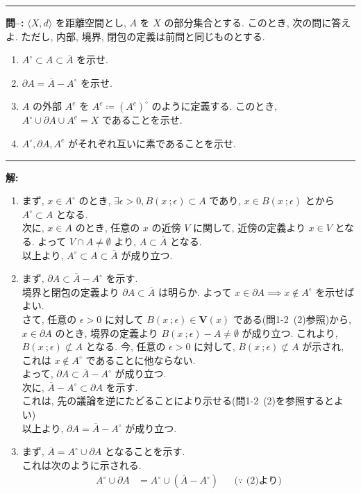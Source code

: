 \documentclass[dvipdfmx,a4j]{jarticle}
\newcounter{secn}   %
\newcounter{pn}     %
\let\np\newpage
\renewcommand{\newpage}{
    \np
    \addtocounter{pn}{1}
}
\newcounter{numpb} %
\newcommand{\pbenumex}[3]{
    \vspace{2mm}
    \hrule
    \vspace{2mm}
    \noindent
    \stepcounter{numpb}\textbf{問\arabic{secn}--\arabic{numpb}:} #1
        \begin{enumerate}
            \setlength{\leftskip}{-8pt} %
            #2
        \end{enumerate}
    \hrule
    \vspace{2mm}
    {\color{red}\textbf{解:}}
    \begin{enumerate}
        \setlength{\leftskip}{-8pt} %
        #3
    \end{enumerate}
}
\begin{document}
\newpage
\pbenumex{
$\langle X, d\rangle$ を距離空間とし, $A$ を $X$ の部分集合とする. このとき, 次の問に答えよ. ただし, 内部, 境界, 閉包の定義は前問と同じものとする.
}{
\item $A^\circ \subset A \subset \overline{A}$ を示せ.
\item $\partial A = \overline{A} - A^\circ$ を示せ.
\item $A$ の外部 $A^e$ を $A^e \coloneqq (A^c)^\circ$ のように定義する. このとき, $A^\circ \cup \partial A \cup A^e = X$ であることを示せ.
\item $A^\circ, \partial A, A^e$ がそれぞれ互いに素であることを示せ.
}{
\item まず, $x \in A^\circ$ のとき, $\exists \epsilon > 0, B(x\ ;\epsilon) \subset A$ であり, $x \in B(x\ ;\epsilon)$ とから $A^\circ \subset A$ となる.\\
次に, $x \in A$ のとき, 任意の $x$ の近傍 $V$ に関して, 近傍の定義より $x \in V$ となる. よって $V \cap A \neq \emptyset$ より, $A \subset \overline{A}$ となる.\\
以上より, $A^\circ \subset A \subset \overline{A}$ が成り立つ.
\item まず, $\partial A \subset \overline{A} - A^\circ$ を示す.\\
境界と閉包の定義より $\partial A \subset \overline{A}$ は明らか. よって $x \in \partial A \implies x \notin A^\circ$ を示せばよい.\\
さて, 任意の $\epsilon > 0$ に対して $B(x\ ;\epsilon) \in \bm{V}(x)$ である(問1-2\ (2)参照)から, $x \in \partial A$ のとき, 境界の定義より $B(x\ ;\epsilon) - A \neq \emptyset$ が成り立つ.
これより, $B(x\ ;\epsilon) \not\subset A$ となる. 今, 任意の $\epsilon > 0$ に対して, $B(x\ ;\epsilon) \not\subset A$ が示され, これは $x \notin A^\circ$ であることに他ならない.\\
よって, $\partial A \subset \overline{A} - A^\circ$ が成り立つ.\\
次に, $\overline{A} - A^\circ \subset \partial A$ を示す.\\
これは, 先の議論を逆にたどることにより示せる(問1-2\ (2)を参照するとよい)\\
以上より, $\partial A = \overline{A} - A^\circ$ が成り立つ.
\item まず, $\overline{A} = A^\circ \cup \partial A$ となることを示す.\\
これは次のように示される.
\begin{align*}
    A^\circ \cup \partial A &= A^\circ \cup (\overline{A} - A^\circ)&&\text{($\because$ (2)より)}\\

\end{align*}}
\end{document}
